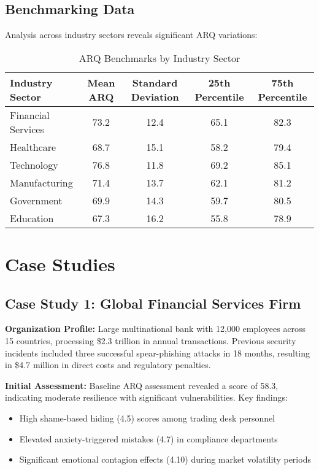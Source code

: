 \documentclass[11pt,a4paper]{article}
\begin{document}
\subsection{Benchmarking Data}

Analysis across industry sectors reveals significant ARQ variations:

\begin{table}[H]
\centering
\caption{ARQ Benchmarks by Industry Sector}
\label{tab:arq_benchmarks}
\begin{tabular}{lcccc}
\toprule
Industry Sector & Mean ARQ & Standard Deviation & 25th Percentile & 75th Percentile \\
\midrule
Financial Services & 73.2 & 12.4 & 65.1 & 82.3 \\
Healthcare & 68.7 & 15.1 & 58.2 & 79.4 \\
Technology & 76.8 & 11.8 & 69.2 & 85.1 \\
Manufacturing & 71.4 & 13.7 & 62.1 & 81.2 \\
Government & 69.9 & 14.3 & 59.7 & 80.5 \\
Education & 67.3 & 16.2 & 55.8 & 78.9 \\
\bottomrule
\end{tabular}
\end{table}

\FloatBarrier

\section{Case Studies}

\subsection{Case Study 1: Global Financial Services Firm}

\textbf{Organization Profile:}
Large multinational bank with 12,000 employees across 15 countries, processing \$2.3 trillion in annual transactions. Previous security incidents included three successful spear-phishing attacks in 18 months, resulting in \$4.7 million in direct costs and regulatory penalties.

\textbf{Initial Assessment:}
Baseline ARQ assessment revealed a score of 58.3, indicating moderate resilience with significant vulnerabilities. Key findings:
\begin{itemize}
\item High shame-based hiding (4.5) scores among trading desk personnel
\item Elevated anxiety-triggered mistakes (4.7) in compliance departments
\item Significant emotional contagion effects (4.10) during market volatility periods
\end{itemize}
\end{document}
